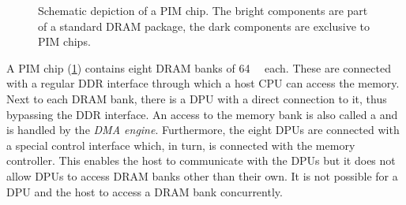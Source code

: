 \begin{figure}

	\caption{
		Schematic depiction of a \ac{PIM} chip.
		The bright components are part of a standard \ac{DRAM} package, the dark components are exclusive to \ac{PIM} chips.~\cite{upmem2019HotChips}
	}
	\label{fig:arch:chip}
\end{figure}

A \ac{PIM} chip (\cref{fig:arch:chip}) contains eight \ac{DRAM} banks of \qty{64}{\mebi\byte} each.
These are connected with a regular \ac{DDR} interface through which a host \ac{CPU} can access the memory.
Next to each \ac{DRAM} bank, there is a \ac{DPU} with a direct connection to it, thus bypassing the \ac{DDR} interface.
An access to the memory bank is also called a  and is handled by the \emph{\ac{DMA} engine}.
Furthermore, the eight \acp{DPU} are connected with a special control interface which, in turn, is connected with the memory controller.
This enables the host to communicate with the \acp{DPU} but it does not allow \acp{DPU} to access \ac{DRAM} banks other than their own.
It is not possible for a \ac{DPU} and the host to access a \ac{DRAM} bank concurrently.


